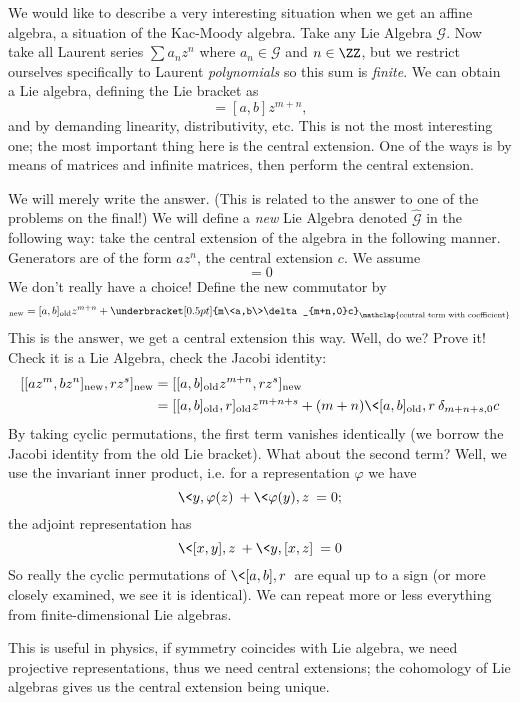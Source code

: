 We would like to describe a very interesting situation when we
get an affine algebra, a situation of the Kac-Moody algebra. Take
any Lie Algebra $\mathscr{G}$. Now take all Laurent series $\sum
a_{n}z^{n}$ where $a_{n}\in\mathscr{G}$ and $n\in\ZZ$, but we
restrict ourselves specifically to Laurent \emph{polynomials} so
this sum is \emph{finite}. We can obtain a Lie algebra, defining
the Lie bracket as
\begin{equation}
[az^{m},bz^{n}] = [a,b]z^{m+n},
\end{equation}
and by demanding linearity, distributivity, etc. This is not the
most interesting one; the most important thing here is the
central extension. One of the ways is by means of matrices and
infinite matrices, then perform the central extension.

We will merely write the answer. (This is related to the answer
to one of the problems on the final!) We will define a \emph{new}
Lie Algebra denoted $\widehat{\mathscr{G}}$ in the following way:
take the central extension of the algebra in the following
manner. Generators are of the form $az^{n}$, the central
extension $c$. We assume
\begin{equation}
[az^{n},c] = 0
\end{equation}
We don't really have a choice! Define the new commutator by
\begin{equation}
[az^{m},bz^{n}]_{\text{new}}=[a,b]_{\text{old}}z^{m+n}+\underbracket[0.5pt]{m\<a,b\>\delta_{m+n,0}c}_{\mathclap{\text{central term with coefficient}}}
\end{equation}
This is the answer, we get a central extension this way. Well, do
we? Prove it! Check it is a Lie Algebra, check the Jacobi
identity:
\begin{subequations}
\begin{align}
[[az^{m},bz^{n}]_{\text{new}},rz^{s}]_{\text{new}} &=[[a,b]_{\text{old}}z^{m+n},rz^{s}]_{\text{new}}\\
&=[[a,b]_{\text{old}},r]_{\text{old}}z^{m+n+s} +
(m+n)\<[a,b]_{\text{old}},r\>\delta_{m+n+s,0}c
\end{align}
\end{subequations}
By taking cyclic permutations, the first term vanishes
identically (we borrow the Jacobi identity from the old Lie
bracket). What about the second term? Well, we use the invariant
inner product, i.e. for a representation $\varphi$ we have
\begin{equation}
\<y,\varphi(z)\>+\<\varphi(y),z\> = 0;
\end{equation}
the adjoint representation has
\begin{equation}
\<[x,y],z\>+\<y,[x,z]\> = 0
\end{equation}
So really the cyclic permutations of $\<[a,b],r\>$ are equal up
to a sign (or more closely examined, we see it is identical). We
can repeat more or less everything from finite-dimensional Lie
algebras.

\begin{rmk}
This is useful in physics, if symmetry coincides with Lie
algebra, we need projective representations, thus we need central
extensions; the cohomology of Lie algebras gives us the central
extension being unique.
\end{rmk}
